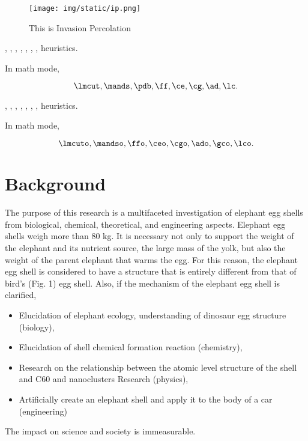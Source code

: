 \begin{figure}[tb]
 \texttt{[image: img/static/ip.png]}
 \caption{This is Invasion Percolation}
 \label{fig:ip}
\end{figure}

\lmcut, \mands, \pdb, \ff, \ce, \cg, \ad, \lc heuristics.

In math mode,

\[
 \lmcut, \mands, \pdb, \ff, \ce, \cg, \ad, \lc.
\]

\lmcuto, \mandso, \ffo, \ceo, \cgo, \ado, \gco, \lco heuristics.

In math mode,

\[
 \lmcuto, \mandso, \ffo, \ceo, \cgo, \ado, \gco, \lco.
\]


\section{Background}

The purpose of this research is
a multifaceted investigation of elephant egg shells from biological, chemical, theoretical, and engineering aspects.
Elephant egg shells weigh more than 80 kg.
It is necessary not only to support the weight of the elephant and its
nutrient source, the large mass of the yolk, but also the weight of the
parent elephant that warms the egg. For this reason, the elephant egg
shell is considered to have a structure that is entirely different
from that of bird's (Fig. 1) egg shell. Also, if the mechanism
of the elephant egg shell is clarified,

\begin{itemize}
 \item Elucidation of elephant ecology, understanding of dinosaur egg structure (biology),
 \item Elucidation of shell chemical formation reaction (chemistry),
 \item Research on the relationship between the atomic level structure of the shell and C60 and nanoclusters Research (physics),
 \item Artificially create an elephant shell and apply it to the body of a car (engineering)
\end{itemize}

The impact on science and society is immeasurable.

